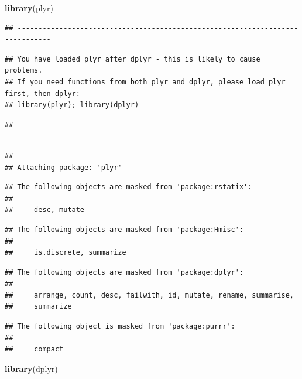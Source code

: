 \documentclass[
]{article}
\newenvironment{Shaded}{\begin{snugshade}}{\end{snugshade}}
\newcommand{\FunctionTok}[1]{\textcolor[rgb]{0.13,0.29,0.53}{\textbf{#1}}}
\newcommand{\NormalTok}[1]{#1}
\begin{document}
\begin{Shaded}
\begin{Highlighting}[]
\FunctionTok{library}\NormalTok{(plyr)}
\end{Highlighting}
\end{Shaded}

\begin{verbatim}
## ------------------------------------------------------------------------------
\end{verbatim}

\begin{verbatim}
## You have loaded plyr after dplyr - this is likely to cause problems.
## If you need functions from both plyr and dplyr, please load plyr first, then dplyr:
## library(plyr); library(dplyr)
\end{verbatim}

\begin{verbatim}
## ------------------------------------------------------------------------------
\end{verbatim}

\begin{verbatim}
## 
## Attaching package: 'plyr'
\end{verbatim}

\begin{verbatim}
## The following objects are masked from 'package:rstatix':
## 
##     desc, mutate
\end{verbatim}

\begin{verbatim}
## The following objects are masked from 'package:Hmisc':
## 
##     is.discrete, summarize
\end{verbatim}

\begin{verbatim}
## The following objects are masked from 'package:dplyr':
## 
##     arrange, count, desc, failwith, id, mutate, rename, summarise,
##     summarize
\end{verbatim}

\begin{verbatim}
## The following object is masked from 'package:purrr':
## 
##     compact
\end{verbatim}

\begin{Shaded}
\begin{Highlighting}[]
\FunctionTok{library}\NormalTok{(dplyr)}
\end{Highlighting}
\end{Shaded}
\end{document}
